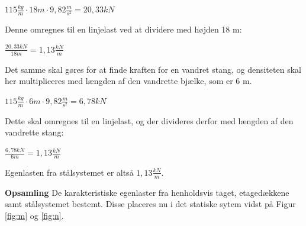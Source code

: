 \begin{center}
	$115\frac{kg}{m}\cdot 18 m \cdot 9,\!82\frac{m}{s^2} = 20,\!33 kN$
\end{center}

Denne omregnes til en linjelast ved at dividere med højden 18 m:

\begin{center}
	$\frac{20,\!33 kN}{18m} = 1,\!13\frac{kN}{m}$
\end{center}

Det samme skal gøres for at finde kraften for en vandret stang, og densiteten skal her multipliceres med længden af den vandrette bjælke, som er 6 m.
\begin{center}
	$115\frac{kg}{m}\cdot 6 m \cdot 9,\!82\frac{m}{s^2} = 6,\!78  kN$
\end{center}

Dette skal omregnes til en linjelast, og der divideres derfor med længden af den vandrette stang:
\begin{center}
$\frac{6,\!78 kN}{6m} = 1,\!13 \frac{kN}{m}$
\end{center}

Egenlasten fra stålsystemet er altså $1,\!13 \frac{kN}{m}$.

\textbf{Opsamling}
\newline
De karakteristiske egenlaster fra henholdsvis taget, etagedækkene samt stålsystemet bestemt. Disse placeres nu i det statiske sytem vidst på Figur \ref{fig:m} og \ref{fig:n}.

